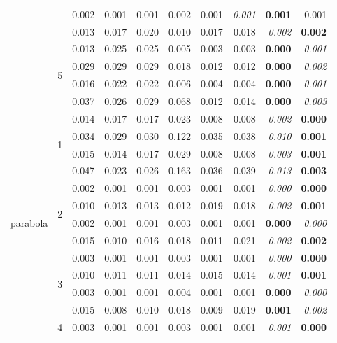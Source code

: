 \documentclass[authoryear, review, 11pt]{elsarticle}
\begin{document}
\begin{table}
\begin{center}
{\begin{tabular}{ccrrrrrrrr}
   &  & 0.002 & 0.001 & 0.001 & 0.002 & 0.001 & \emph{0.001} & \textbf{0.001} & 0.001 \\ 
   &  & 0.013 & 0.017 & 0.020 & 0.010 & 0.017 & 0.018 & \emph{0.002} & \textbf{0.002} \\ 
  \cline{3-10}
   & \multirow{4}{*}{5} & 0.013 & 0.025 & 0.025 & 0.005 & 0.003 & 0.003 & \textbf{0.000} & \emph{0.001} \\ 
   &  & 0.029 & 0.029 & 0.029 & 0.018 & 0.012 & 0.012 & \textbf{0.000} & \emph{0.002} \\ 
   &  & 0.016 & 0.022 & 0.022 & 0.006 & 0.004 & 0.004 & \textbf{0.000} & \emph{0.001} \\ 
   &  & 0.037 & 0.026 & 0.029 & 0.068 & 0.012 & 0.014 & \textbf{0.000} & \emph{0.003} \\ 
  \hline
  \multirow{20}{*}{parabola} & \multirow{4}{*}{1} & 0.014 & 0.017 & 0.017 & 0.023 & 0.008 & 0.008 & \emph{0.002} & \textbf{0.000} \\ 
   &  & 0.034 & 0.029 & 0.030 & 0.122 & 0.035 & 0.038 & \emph{0.010} & \textbf{0.001} \\ 
   &  & 0.015 & 0.014 & 0.017 & 0.029 & 0.008 & 0.008 & \emph{0.003} & \textbf{0.001} \\ 
   &  & 0.047 & 0.023 & 0.026 & 0.163 & 0.036 & 0.039 & \emph{0.013} & \textbf{0.003} \\ 
  \cline{3-10}
   & \multirow{4}{*}{2} & 0.002 & 0.001 & 0.001 & 0.003 & 0.001 & 0.001 & \emph{0.000} & \textbf{0.000} \\ 
   &  & 0.010 & 0.013 & 0.013 & 0.012 & 0.019 & 0.018 & \emph{0.002} & \textbf{0.001} \\ 
   &  & 0.002 & 0.001 & 0.001 & 0.003 & 0.001 & 0.001 & \textbf{0.000} & \emph{0.000} \\ 
   &  & 0.015 & 0.010 & 0.016 & 0.018 & 0.011 & 0.021 & \emph{0.002} & \textbf{0.002} \\ 
  \cline{3-10}
   & \multirow{4}{*}{3} & 0.003 & 0.001 & 0.001 & 0.003 & 0.001 & 0.001 & \emph{0.000} & \textbf{0.000} \\ 
   &  & 0.010 & 0.011 & 0.011 & 0.014 & 0.015 & 0.014 & \emph{0.001} & \textbf{0.001} \\ 
   &  & 0.003 & 0.001 & 0.001 & 0.004 & 0.001 & 0.001 & \textbf{0.000} & \emph{0.000} \\ 
   &  & 0.015 & 0.008 & 0.010 & 0.018 & 0.009 & 0.019 & \textbf{0.001} & \emph{0.002} \\ 
  \cline{3-10}
   & \multirow{4}{*}{4} & 0.003 & 0.001 & 0.001 & 0.003 & 0.001 & 0.001 & \emph{0.001} & \textbf{0.000} \\ 

\end{tabular}}
\end{center}
\end{table}
\end{document}
